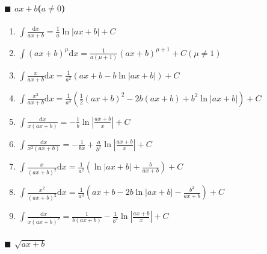 \newcommand{\md}{\mathrm{d}}
\newcommand{\me}{\mathrm{e}}

\paragraph{$\blacksquare$ $ax+b$($a \neq 0$)}

\begin{enumerate}

\item $ \int \frac{\md x}{ax+b} = \frac{1}{a} \ln |ax+b| + C $

\item $ \int (ax+b)^{\mu} \md x = \frac{1}{a(\mu+1)}(ax+b)^{\mu+1} + C (\mu \neq 1) $

\item $ \int \frac{x}{ax+b} \md x = \frac{1}{a^2} (ax+b-b\ln|ax+b|) + C $

\item $ \int \frac{x^2}{ax+b} \md x = \frac{1}{a^3} \left( \frac{1}{2}(ax+b)^2-2b(ax+b)+b^2\ln|ax+b| \right) + C $

\item $ \int \frac{\md x}{x(ax+b)} = -\frac{1}{b}\ln \left| \frac{ax+b}{x} \right| + C $

\item $ \int \frac{\md x}{x^2(ax+b)} = -\frac{1}{bx} + \frac{a}{b^2}\ln\left| \frac{ax+b}{x} \right| + C $

\item $ \int \frac{x}{(ax+b)^2} \md x = \frac{1}{a^2}\left( \ln|ax+b|+\frac{b}{ax+b} \right) + C $

\item $ \int \frac{x^2}{(ax+b)^2}\md x = \frac{1}{a^3} \left( ax+b-2b\ln|ax+b|-\frac{b^2}{ax+b} \right) + C $

\item $ \int \frac{\md x}{x(ax+b)^2} = \frac{1}{b(ax+b)} - \frac{1}{b^2}\ln\left| \frac{ax+b}{x} \right| + C $

\end{enumerate}

\paragraph{$\blacksquare$ $\sqrt{ax+b}$}

